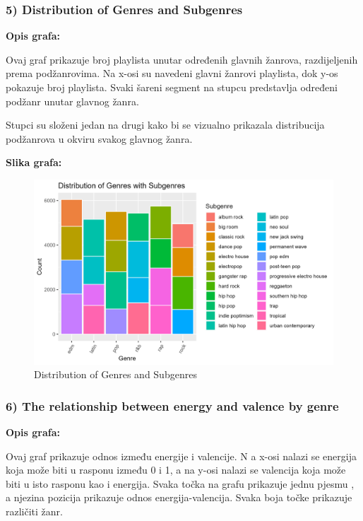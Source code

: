 		\subsubsection{5) Distribution of Genres and Subgenres}
	
	\textbf{Opis grafa:}
	
		Ovaj graf prikazuje broj playlista unutar određenih glavnih žanrova, razdijeljenih prema podžanrovima. Na x-osi su navedeni glavni žanrovi playlista, dok y-os pokazuje broj playlista. Svaki šareni segment na stupcu predstavlja određeni podžanr unutar glavnog žanra.
		
		Stupci su složeni jedan na drugi kako bi se vizualno prikazala distribucija podžanrova u okviru svakog glavnog žanra. 
	
	
	\textbf{Slika grafa:}
	\begin{figure}[H]
		\includegraphics[scale=0.9]{slike/Genre-Subgenre.png}
		\centering
		\caption{Distribution of Genres and Subgenres}
		
	\end{figure}


		\subsubsection{6) The relationship between energy and valence by genre}
    
    \textbf{Opis grafa:}
    
    	Ovaj graf prikazuje odnos između energije i valencije. N a x-osi nalazi se energija koja može biti u rasponu između 0 i 1, a na y-osi nalazi se valencija koja može biti u isto rasponu kao i energija. Svaka točka na grafu prikazuje jednu pjesmu , a njezina pozicija prikazuje odnos energija-valencija. Svaka boja točke prikazuje različiti žanr. 
    
